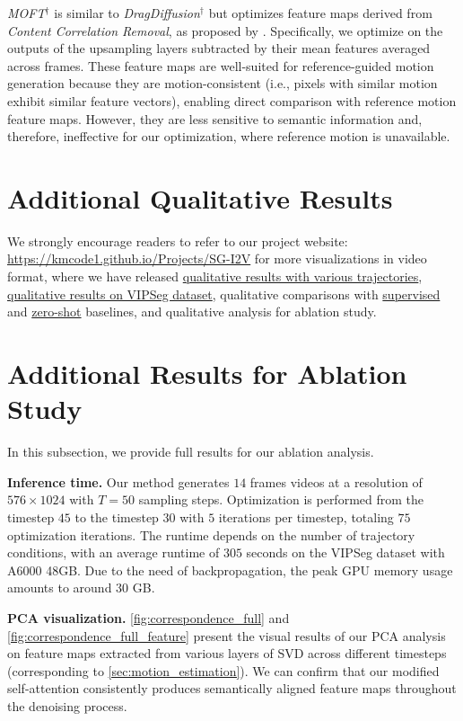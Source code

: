 \textit{MOFT$^\dagger$} is similar to \textit{DragDiffusion$^\dagger$} but optimizes feature maps derived from \textit{Content Correlation Removal}, as proposed by \citet{MOFT}. Specifically, we optimize on the outputs of the upsampling layers subtracted by their mean features averaged across frames. These feature maps are well-suited for reference-guided motion generation because they are motion-consistent (i.e., pixels with similar motion exhibit similar feature vectors), enabling direct comparison with reference motion feature maps. However, they are less sensitive to semantic information and, therefore, ineffective for our optimization, where reference motion is unavailable.

\section{Additional Qualitative Results}
We strongly encourage readers to refer to our project website: \url{https://kmcode1.github.io/Projects/SG-I2V} for more visualizations in video format, where we have released \href{https://kmcode1.github.io/Projects/SG-I2V\#obj-motion-results}{qualitative results with various trajectories}, \href{https://kmcode1.github.io/Projects/SG-I2V/gallery_VIPSeg.html}{qualitative results on VIPSeg dataset}, qualitative comparisons with \href{https://kmcode1.github.io/Projects/SG-I2V\#baseline-comparison}{supervised} and \href{https://kmcode1.github.io/Projects/SG-I2V/gallery_zero.html}{zero-shot} baselines, and qualitative analysis for ablation study.

\section{Additional Results for Ablation Study}
In this subsection, we provide full results for our ablation analysis.

\textbf{Inference time.} Our method generates $14$ frames videos at a resolution of $576 \times 1024$ with $T=50$ sampling steps. Optimization is performed from the timestep $45$ to the timestep $30$ with $5$ iterations per timestep, totaling $75$ optimization iterations. The runtime depends on the number of trajectory conditions, with an average runtime of $305$ seconds on the VIPSeg dataset with A6000 48GB. Due to the need of backpropagation, the peak GPU memory usage amounts to around $30$ GB.

\textbf{PCA visualization.} \cref{fig:correspondence_full} and \cref{fig:correspondence_full_feature} present the visual results of our PCA analysis on feature maps extracted from various layers of SVD across different timesteps (corresponding to \cref{sec:motion_estimation}). 
We can confirm that our modified self-attention consistently produces semantically aligned feature maps throughout the denoising process.

